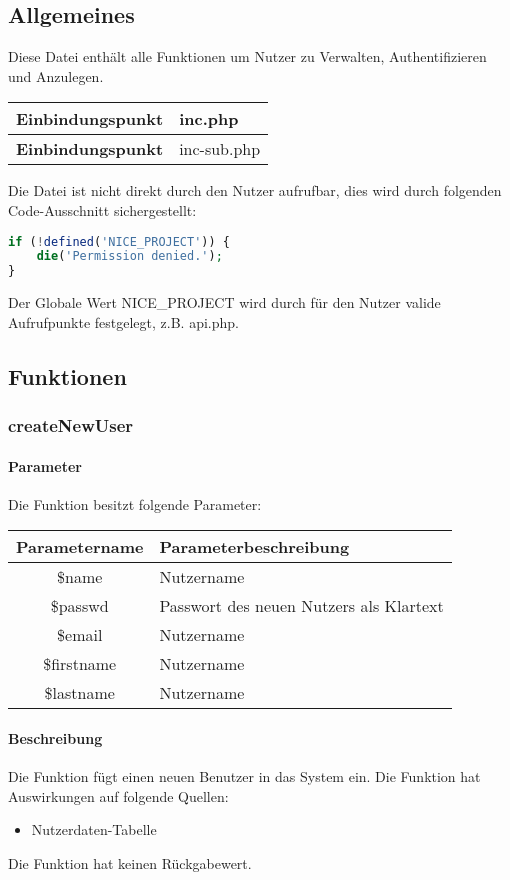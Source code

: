 \subsection{Allgemeines} Diese Datei enthält alle Funktionen um Nutzer zu Verwalten, Authentifizieren und Anzulegen.
\begin{table}[H]
	\begin{tabular}{|c|p{11cm}|}
		\hline
		\textbf{Einbindungspunkt} & inc.php \\ \hline
		\textbf{Einbindungspunkt} & inc-sub.php \\ \hline
	\end{tabular}
\end{table}
Die Datei ist nicht direkt durch den Nutzer aufrufbar, dies wird durch folgenden Code-Ausschnitt sichergestellt:
\begin{lstlisting}[language=php]
if (!defined('NICE_PROJECT')) {
	die('Permission denied.');
}
\end{lstlisting}
Der Globale Wert {\glqq NICE\_PROJECT\grqq} wird durch für den Nutzer valide Aufrufpunkte festgelegt, z.B. {\glqq api.php\grqq}.
\newpage
\subsection{Funktionen}
\subsubsection{createNewUser}
\paragraph{Parameter} Die Funktion besitzt folgende Parameter:
\begin{table}[H]
	\begin{tabular}{|c|p{11cm}|}
		\hline
		\textbf{Parametername} & \textbf{Parameterbeschreibung} \\ \hline
		\$name      & Nutzername \\ \hline
		\$passwd    & Passwort des neuen Nutzers als Klartext \\ \hline
		\$email     & Nutzername \\ \hline
		\$firstname & Nutzername \\ \hline
		\$lastname  & Nutzername \\ \hline
	\end{tabular}
\end{table}
\paragraph{Beschreibung} Die Funktion fügt einen neuen Benutzer in das System ein. Die Funktion hat Auswirkungen auf folgende Quellen:
\begin{itemize}
	\item Nutzerdaten-Tabelle
\end{itemize}
Die Funktion hat keinen Rückgabewert.
